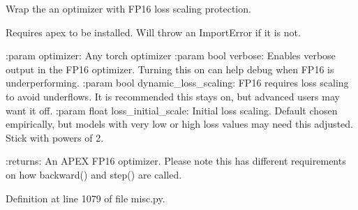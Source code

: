 \begin{DoxyVerb}Wrap the an optimizer with FP16 loss scaling protection.

Requires apex to be installed. Will throw an ImportError if it is not.

:param optimizer:
    Any torch optimizer
:param bool verbose:
    Enables verbose output in the FP16 optimizer. Turning this on can help
    debug when FP16 is underperforming.
:param bool dynamic_loss_scaling:
    FP16 requires loss scaling to avoid underflows. It is recommended this
    stays on, but advanced users may want it off.
:param float loss_initial_scale:
    Initial loss scaling. Default chosen empirically, but models with very low
    or high loss values may need this adjusted. Stick with powers of 2.

:returns:
    An APEX FP16 optimizer. Please note this has different requirements on
    how backward() and step() are called.
\end{DoxyVerb}
 

Definition at line 1079 of file misc.\+py.


